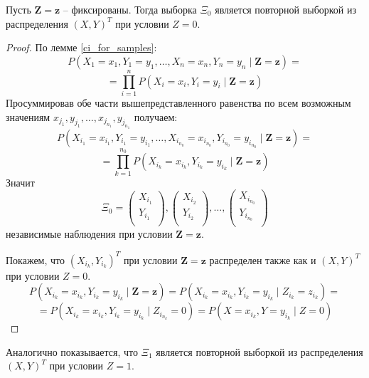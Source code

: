 \begin{theorem}
    Пусть $\mathbf{Z}=\mathbf{z}$ -- фиксированы. Тогда выборка $\Xi_0$ является повторной выборкой из распределения $(X,Y)^T$ при условии $Z=0$.
\end{theorem}
\begin{proof}
    По лемме \ref{ci_for_samples}:
    $$
    P(X_1=x_1,Y_1=y_1,\ldots,X_n=x_n,Y_n=y_n \mid \mathbf{Z}=\mathbf{z})=
    $$
    $$
    =\prod_{i=1}^n P(X_i=x_i, Y_i=y_i \mid \mathbf{Z}=\mathbf{z})
    $$
    Просуммировав обе части вышепредставленного равенства по всем возможным значениям 
    $x_{j_1}, y_{j_1}, \ldots, x_{j_{n_1}},y_{j_{n_1}}$ получаем:
    $$
    P(X_{i_1}=x_{i_1},Y_{i_1}=y_{i_1},\ldots,X_{i_{n_0}}=x_{i_{n_0}},Y_{i_{n_0}}=y_{i_{n_0}} \mid \mathbf{Z}=\mathbf{z})=
    $$
    $$
    =\prod_{k=1}^{n_0} P(X_{i_k}=x_{i_k}, Y_{i_k}=y_{i_k} \mid \mathbf{Z}=\mathbf{z})
    $$
    Значит $$
    \Xi_0=
    \begin{pmatrix}
        X_{i_1} \\
        Y_{i_1} \\
    \end{pmatrix},
    \begin{pmatrix}
        X_{i_2} \\
        Y_{i_2} \\
    \end{pmatrix}, \ldots,
    \begin{pmatrix}
        X_{i_{n_0}} \\
        Y_{i_{n_0}} \\
    \end{pmatrix} 
    $$
    независимые наблюдения при условии $\mathbf{Z}=\mathbf{z}$.

    Покажем, что $(X_{i_k},Y_{i_k})^T$ при условии $\mathbf{Z}=\mathbf{z}$ распределен также как и 
    $(X,Y)^T$ при условии $Z=0$.
    $$
    P(X_{i_k}=x_{i_k}, Y_{i_k}=y_{i_k} \mid \mathbf{Z}=\mathbf{z}) =
    P(X_{i_k}=x_{i_k}, Y_{i_k}=y_{i_k} \mid Z_{i_k}=z_{i_k}) = $$
    $$=P(X_{i_k}=x_{i_k}, Y_{i_k}=y_{i_k} \mid Z_{i_{n_k}}=0)=
    P(X=x_{i_k}, Y=y_{i_k} \mid Z=0)$$
\end{proof}

Аналогично показывается, что $\Xi_1$ является повторной выборкой из распределения $(X,Y)^T$ при условии $Z=1$.

